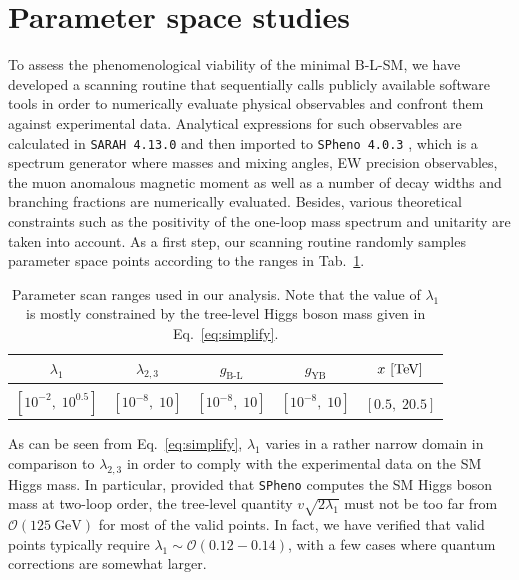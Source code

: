 \documentclass[a4paper,11pt]{article}
\renewcommand{\(}{\left(}
\renewcommand{\)}{\right)}
\renewcommand{\[}{\left[}
\renewcommand{\]}{\right]}
\newcommand{\ro}[1]{\textrm{#1}}
\begin{document}
\section{Parameter space studies}
\label{sec:parameter-space-studies}

To assess the phenomenological viability of the minimal B-L-SM, we have developed a scanning routine that sequentially calls publicly available software tools in order to numerically evaluate physical observables and confront them against experimental data. Analytical expressions for such observables are calculated in \texttt{SARAH 4.13.0} \cite{Staub:2008uz,Staub:2013tta} and then imported to \texttt{SPheno 4.0.3} \cite{Porod:2003um,Porod:2011nf}, which is a spectrum generator where masses and mixing angles, EW precision observables, the muon anomalous magnetic moment as well as a number of decay widths and branching fractions are numerically evaluated. Besides, various theoretical constraints such as the positivity of the one-loop mass spectrum and unitarity are taken into account. As a first step, our scanning routine randomly samples parameter space points according to the ranges in Tab.~\ref{tab:scan}.
%
\begin{table}[htb!]
	\begin{center}
		\begin{tabular}{ccccc}
			\toprule                     
			$\lambda_{1}$ & $\lambda_{2,3}$ & $g_\ro{B-L}$ & $g_\ro{YB}$ & $x~{\rm [TeV]}$  
			\\       
						\midrule \\ 
			$\[10^{-2},\; 10^{0.5}
			\]$ 			    							& $\[10^{-8},\; 10
			\]$ 			    							& $\[10^{-8},\; 10
			\]$		& $\[10^{-8},\; 10
			\]$	&	$\[0.5,\; 20.5
			\]$ 	\\
			\bottomrule
		\end{tabular}  
		\caption{Parameter scan ranges used in our analysis. Note that the value of $\lambda_1$ is mostly constrained by the tree-level Higgs boson mass given in Eq.~\eqref{eq:simplify}. 
		}
		\label{tab:scan}
	\end{center}
\end{table}
%  
As can be seen from Eq.~\eqref{eq:simplify}, $\lambda_1$ varies in a rather narrow domain in comparison to $\lambda_{2,3}$ in order to comply with the experimental data on the SM Higgs mass. In particular, provided that \texttt{SPheno} computes the SM Higgs boson mass at two-loop order, the tree-level quantity $v \sqrt{2 \lambda_1}$ must not be too far from $\mathcal{O}\(125~\ro{GeV}\)$ for most of the valid points. In fact, we have verified that valid points typically require $\lambda_1 \sim \mathcal{O}\(0.12 - 0.14\)$, with a few cases where quantum corrections are somewhat larger.
\end{document}
